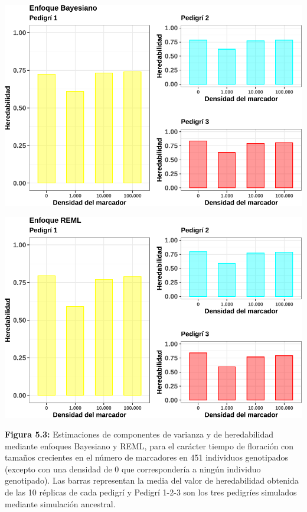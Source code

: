 \documentclass[11pt,spanish,a4paper,oneside,]{book} %
\begin{document}
\begin{center}\includegraphics[width=1\linewidth]{figures/param_Bayes} \end{center}

\begin{center}\includegraphics[width=1\linewidth]{figures/param_reml} \end{center}

\noindent
\textbf{Figura 5.3:} Estimaciones de componentes de varianza y de heredabilidad mediante enfoques Bayesiano y REML, para el carácter tiempo de floración con tamaños crecientes en el número de marcadores en 451 individuos genotipados (excepto con una densidad de 0 que correspondería a ningún individuo genotipado). Las barras representan la media del valor de heredabilidad obtenida de las 10 réplicas de cada pedigrí y Pedigrí 1-2-3 son los tres pedigríes simulados mediante simulación ancestral.
\end{document}

